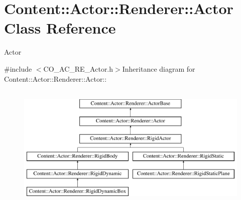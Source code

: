 \hypertarget{classContent_1_1Actor_1_1Renderer_1_1Actor}{
\section{Content::Actor::Renderer::Actor Class Reference}
\label{classContent_1_1Actor_1_1Renderer_1_1Actor}
}


Actor  


{\ttfamily \#include $<$CO\_\-AC\_\-RE\_\-Actor.h$>$}Inheritance diagram for Content::Actor::Renderer::Actor::\begin{figure}[H]
\begin{center}
\leavevmode
\includegraphics[height=6cm]{classContent_1_1Actor_1_1Renderer_1_1Actor}
\end{center}
\end{figure}
